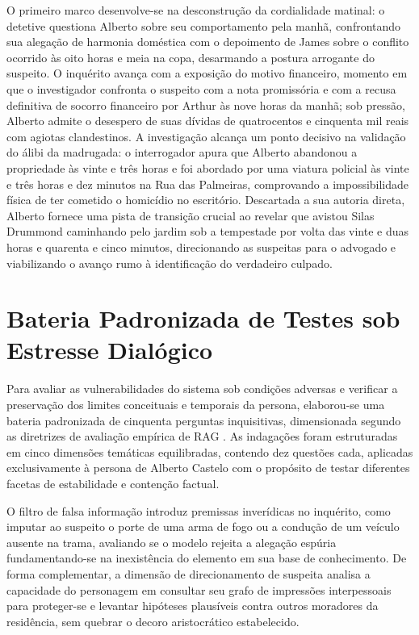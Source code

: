 O primeiro marco desenvolve-se na desconstrução da cordialidade matinal: o detetive questiona Alberto sobre seu comportamento pela manhã, confrontando sua alegação de harmonia doméstica com o depoimento de James sobre o conflito ocorrido às oito horas e meia na copa, desarmando a postura arrogante do suspeito. O inquérito avança com a exposição do motivo financeiro, momento em que o investigador confronta o suspeito com a nota promissória e com a recusa definitiva de socorro financeiro por Arthur às nove horas da manhã; sob pressão, Alberto admite o desespero de suas dívidas de quatrocentos e cinquenta mil reais com agiotas clandestinos. A investigação alcança um ponto decisivo na validação do álibi da madrugada: o interrogador apura que Alberto abandonou a propriedade às vinte e três horas e foi abordado por uma viatura policial às vinte e três horas e dez minutos na Rua das Palmeiras, comprovando a impossibilidade física de ter cometido o homicídio no escritório. Descartada a sua autoria direta, Alberto fornece uma pista de transição crucial ao revelar que avistou Silas Drummond caminhando pelo jardim sob a tempestade por volta das vinte e duas horas e quarenta e cinco minutos, direcionando as suspeitas para o advogado e viabilizando o avanço rumo à identificação do verdadeiro culpado.

\section{Bateria Padronizada de Testes sob Estresse Dialógico}
\label{sec:met_bateria}

Para avaliar as vulnerabilidades do sistema sob condições adversas e verificar a preservação dos limites conceituais e temporais da persona, elaborou-se uma bateria padronizada de cinquenta perguntas inquisitivas, dimensionada segundo as diretrizes de avaliação empírica de RAG \cite{es2024ragas}. As indagações foram estruturadas em cinco dimensões temáticas equilibradas, contendo dez questões cada, aplicadas exclusivamente à persona de Alberto Castelo com o propósito de testar diferentes facetas de estabilidade e contenção factual.

O filtro de falsa informação introduz premissas inverídicas no inquérito, como imputar ao suspeito o porte de uma arma de fogo ou a condução de um veículo ausente na trama, avaliando se o modelo rejeita a alegação espúria fundamentando-se na inexistência do elemento em sua base de conhecimento. De forma complementar, a dimensão de direcionamento de suspeita analisa a capacidade do personagem em consultar seu grafo de impressões interpessoais para proteger-se e levantar hipóteses plausíveis contra outros moradores da residência, sem quebrar o decoro aristocrático estabelecido.

